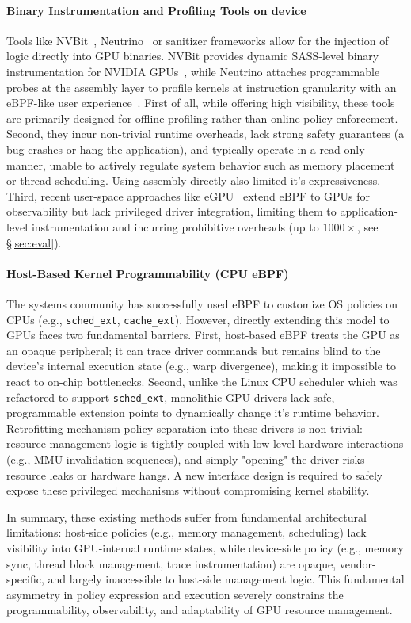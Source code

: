 \paragraph{Binary Instrumentation and Profiling Tools on device}
Tools like NVBit~\cite{nvbit}, Neutrino~\cite{neutrino} or sanitizer frameworks allow for the injection of logic directly into GPU binaries. NVBit
provides dynamic SASS-level binary instrumentation for NVIDIA
GPUs~\cite{nvbit}, while Neutrino attaches programmable probes
at the assembly layer to profile kernels at instruction granularity
with an eBPF-like user experience~\cite{neutrino}. 
First of all, while offering high visibility, these tools are primarily designed for offline
profiling rather than online policy enforcement. Second, they incur non-trivial runtime overheads, lack strong safety guarantees (a
bug crashes or hang the application), and typically operate in a read-only manner, unable to actively regulate system behavior such as
memory placement or thread scheduling. Using assembly directly also limited it's expressiveness. Third, recent user-space approaches like eGPU~\cite{egpu} extend eBPF to GPUs for observability but lack privileged driver integration, limiting them to application-level instrumentation and incurring prohibitive overheads (up to $1000\times$, see \S\ref{sec:eval}).

\paragraph{Host-Based Kernel Programmability (CPU eBPF)}
The systems community has successfully used eBPF to customize OS policies on CPUs (e.g., \texttt{sched\_ext}, \texttt{cache\_ext}). However, directly extending this model to GPUs faces two fundamental barriers. First, host-based eBPF treats the GPU as an opaque peripheral; it can trace driver commands but remains blind to the device's internal execution state (e.g., warp divergence), making it impossible to react to on-chip bottlenecks. Second, unlike the Linux CPU scheduler which was refactored to support \texttt{sched\_ext}, monolithic GPU drivers lack safe, programmable extension points to dynamically change it's runtime behavior. Retrofitting mechanism-policy separation into these drivers is non-trivial: resource management logic is tightly coupled with low-level hardware interactions (e.g., MMU invalidation sequences), and simply "opening" the driver risks resource leaks or hardware hangs. A new interface design is required to safely expose these privileged mechanisms without compromising kernel stability.

In summary, these existing methods suffer from fundamental architectural limitations: host-side policies (e.g., memory management, scheduling) lack visibility into GPU-internal runtime states, while device-side policy (e.g., memory sync, thread block management, trace instrumentation) are opaque, vendor-specific, and largely inaccessible to host-side management logic. This fundamental asymmetry in policy expression and execution severely constrains the programmability, observability, and adaptability of GPU resource management.
